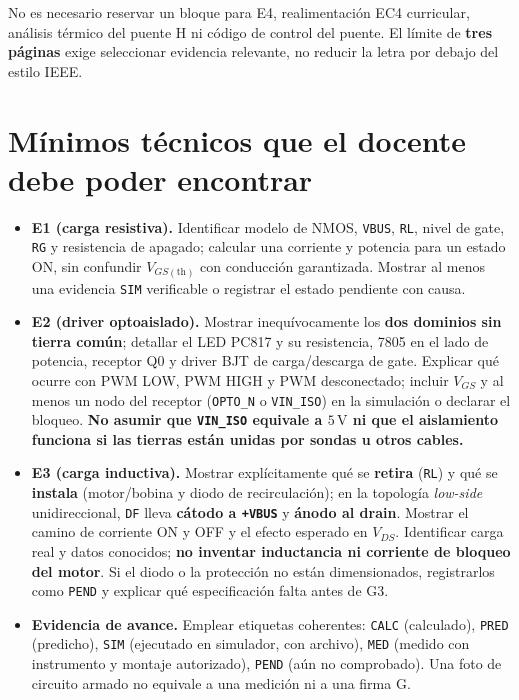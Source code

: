 \documentclass[10pt, a4paper]{article}
\newcommand{\evtag}[1]{\texttt{#1}}
\begin{document}
\vspace{2pt}
{\footnotesize No es necesario reservar un bloque para E4, realimentación EC4 curricular, análisis térmico del puente H ni código de control del puente. El límite de \textbf{tres páginas} exige seleccionar evidencia relevante, no reducir la letra por debajo del estilo IEEE.}

\section{Mínimos técnicos que el docente debe poder encontrar}

\begin{itemize}
    \setlength{\itemsep}{4pt}\setlength{\parskip}{0pt}
    \item \textbf{E1 (carga resistiva).} Identificar modelo de NMOS, \texttt{VBUS}, \texttt{RL}, nivel de gate, \texttt{RG} y resistencia de apagado; calcular una corriente y potencia para un estado ON, sin confundir $V_{GS(\text{th})}$ con conducción garantizada. Mostrar al menos una evidencia \evtag{SIM} verificable o registrar el estado pendiente con causa.

    \item \textbf{E2 (driver optoaislado).} Mostrar inequívocamente los \textbf{dos dominios sin tierra común}; detallar el LED PC817 y su resistencia, 7805 en el lado de potencia, receptor Q0 y driver BJT de carga/descarga de gate. Explicar qué ocurre con PWM LOW, PWM HIGH y PWM desconectado; incluir $V_{GS}$ y al menos un nodo del receptor (\texttt{OPTO\_N} o \texttt{VIN\_ISO}) en la simulación o declarar el bloqueo. \textbf{No asumir que \texttt{VIN\_ISO} equivale a $5\,\mathrm{V}$ ni que el aislamiento funciona si las tierras están unidas por sondas u otros cables.}

    \item \textbf{E3 (carga inductiva).} Mostrar explícitamente qué se \textbf{retira} (\texttt{RL}) y qué se \textbf{instala} (motor/bobina y diodo de recirculación); en la topología \textit{low-side} unidireccional, \texttt{DF} lleva \textbf{cátodo a \texttt{+VBUS}} y \textbf{ánodo al drain}. Mostrar el camino de corriente ON y OFF y el efecto esperado en $V_{DS}$. Identificar carga real y datos conocidos; \textbf{no inventar inductancia ni corriente de bloqueo del motor}. Si el diodo o la protección no están dimensionados, registrarlos como \evtag{PEND} y explicar qué especificación falta antes de G3.

    \item \textbf{Evidencia de avance.} Emplear etiquetas coherentes: \evtag{CALC} (calculado), \evtag{PRED} (predicho), \evtag{SIM} (ejecutado en simulador, con archivo), \evtag{MED} (medido con instrumento y montaje autorizado), \evtag{PEND} (aún no comprobado). Una foto de circuito armado no equivale a una medición ni a una firma G.
\end{itemize}
\end{document}
